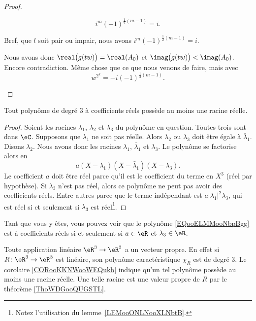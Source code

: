 \begin{proof}
\begin{subproof}
\begin{subproof}
\begin{subproof}
				\begin{equation}
					i^m(-1)^{\frac{ 1 }{2}(m-1)}=i.
				\end{equation}
			\end{subproof}
			Bref, que \( l\) soit pair ou impair, nous avons \( i^m(-1)^{\frac{ 1 }{2}(m-1)}=i\).
		\end{subproof}
		Nous avons donc \( \real\big( g(tw) \big)=\real(A_0)\) et \( \imag\big( g(tw) \big)<\imag(A_0)\). Encore contradiction.
		\spitem[Si \( \imag(A_0)>0\)]
		Même chose que ce que nous venons de faire, mais avec
		\begin{equation}
			w^{2^k}=-i(-1)^{\frac{ 1 }{2}(m-1)}.
		\end{equation}
	\end{subproof}
\end{proof}


\begin{corollary}       \label{CORooKKNWooWEQukb}
	Tout polynôme de degré \( 3\) à coefficients réels possède au moins une racine réelle.
\end{corollary}

\begin{proof}
	Soient les racines \( \lambda_1\), \( \lambda_2\) et \( \lambda_3\) du polynôme en question. Toutes trois sont dans \( \eC\). Supposons que \( \lambda_1\) ne soit pas réelle. Alors \( \lambda_2\) ou \( \lambda_3\) doit être égale à \( \bar\lambda_1\). Disons \( \lambda_2\). Nous avons donc les racines \( \lambda_1\), \( \bar\lambda_1\) et \( \lambda_3\). Le polynôme se factorise alors en
	\begin{equation}        \label{EQooELMMooNbpBgg}
		a(X-\lambda_1)(X-\bar\lambda_1)(X-\lambda_3).
	\end{equation}
	Le coefficient \( a\) doit être réel parce qu'il est le coefficient du terme en \( X^3\) (réel par hypothèse). Si \( \lambda_3\) n'est pas réel, alors ce polynôme ne peut pas avoir des coefficients réels. Entre autres parce que le terme indépendant est \( a| \lambda_1 |^2\lambda_3\), qui est réel si et seulement si \( \lambda_3\) est réel\footnote{Notez l'utilisation du lemme~\ref{LEMooONLNooXLNbtB}.}.
\end{proof}
Tant que vous y êtes, vous pouvez voir que le polynôme \eqref{EQooELMMooNbpBgg} est à coefficients réels si et seulement si \( a\in \eR\) et \( \lambda_3\in \eR\).

\begin{example}     \label{EXooIPLOooSNfiWg}
	Toute application linéaire \( \eR^3\to \eR^3\) a un vecteur propre. En effet si \( R\colon \eR^3\to \eR^3\) est linéaire, son polynôme caractéristique \( \chi_R\) est de degré \( 3\). Le corolaire \ref{CORooKKNWooWEQukb} indique qu'un tel polynôme possède au moins une racine réelle.
	Une telle racine est une valeur propre de \( R\) par le théorème \ref{ThoWDGooQUGSTL}.
\end{example}

